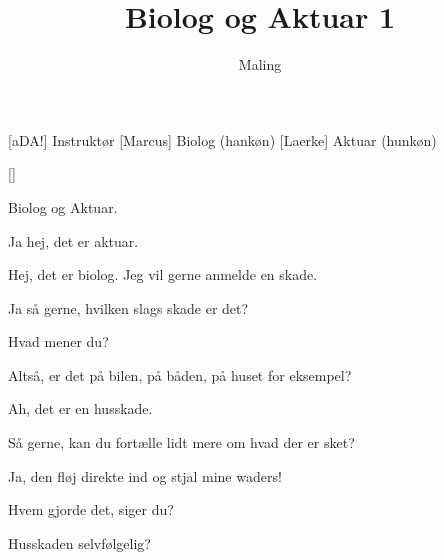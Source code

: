 \documentclass[a4paper,11pt]{article}
\title{Biolog og Aktuar 1}
\author{Maling}
\begin{document}
\maketitle

\begin{roles}
[aDA!] Instruktør
[Marcus] Biolog (hankøn)
[Laerke] Aktuar (hunkøn)
\end{roles}

\begin{props}
[]
\end{props}

\begin{sketch}
 Biolog og Aktuar.


 Ja hej, det er aktuar.

 Hej, det er biolog. Jeg vil gerne anmelde en skade.

 Ja så gerne, hvilken slags skade er det?

 Hvad mener du?

 Altså, er det på bilen, på båden, på huset for eksempel?

 Ah, det er en husskade.

 Så gerne, kan du fortælle lidt mere om hvad der er sket?

 Ja, den fløj direkte ind og stjal mine waders!

 Hvem gjorde det, siger du?

 Husskaden selvfølgelig?

\end{sketch}
\end{document}
